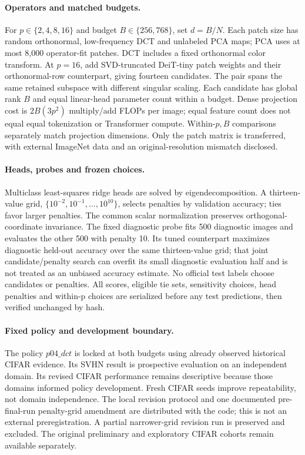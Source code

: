 \documentclass[11pt]{article}
\begin{document}
\paragraph{Operators and matched budgets.}
For $p\in\{2,4,8,16\}$ and budget $B\in\{256,768\}$, set $d=B/N$. Each patch size has random orthonormal, low-frequency DCT and unlabeled PCA maps; PCA uses at most 8,000 operator-fit patches. DCT includes a fixed orthonormal color transform. At $p=16$, add SVD-truncated DeiT-tiny patch weights and their orthonormal-row counterpart, giving fourteen candidates. The pair spans the same retained subspace with different singular scaling. Each candidate has global rank $B$ and equal linear-head parameter count within a budget. Dense projection cost is $2B(3p^2)$ multiply/add FLOPs per image; equal feature count does not equal equal tokenization or Transformer compute. Within-$p,B$ comparisons separately match projection dimensions. Only the patch matrix is transferred, with external ImageNet data and an original-resolution mismatch disclosed.

\paragraph{Heads, probes and frozen choices.}
Multiclass least-squares ridge heads are solved by eigendecomposition. A thirteen-value grid, $\{10^{-2},10^{-1},\ldots,10^{10}\}$, selects penalties by validation accuracy; ties favor larger penalties. The common scalar normalization preserves orthogonal-coordinate invariance. The fixed diagnostic probe fits 500 diagnostic images and evaluates the other 500 with penalty 10. Its tuned counterpart maximizes diagnostic held-out accuracy over the same thirteen-value grid; that joint candidate/penalty search can overfit its small diagnostic evaluation half and is not treated as an unbiased accuracy estimate. No official test labels choose candidates or penalties. All scores, eligible tie sets, sensitivity choices, head penalties and within-p choices are serialized before any test predictions, then verified unchanged by hash.

\paragraph{Fixed policy and development boundary.}
The policy $p04\_dct$ is locked at both budgets using already observed historical CIFAR evidence. Its SVHN result is prospective evaluation on an independent domain. Its revised CIFAR performance remains descriptive because those domains informed policy development. Fresh CIFAR seeds improve repeatability, not domain independence. The local revision protocol and one documented pre-final-run penalty-grid amendment are distributed with the code; this is not an external preregistration. A partial narrower-grid revision run is preserved and excluded. The original preliminary and exploratory CIFAR cohorts remain available separately.
\end{document}

